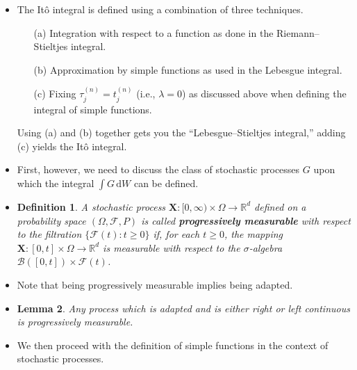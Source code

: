 \documentclass[10pt]{article}
\newtheorem{lemma}{Lemma}
\newtheorem{definition}[lemma]{Definition}
\newcommand{\dee}{\mathrm{d}}
\newcommand{\ve}[1]{\mathbf{#1}}
\newcommand{\mcal}[1]{\mathcal{#1}}
\newcommand{\Real}{\mathbb{R}}
\begin{document}
\begin{itemize}
  \item The It\^{o} integral is defined using a combination of three techniques.
  \begin{itemize}
    \item[(a)] Integration with respect to a function as done in the Riemann--Stieltjes integral.
    \item[(b)] Approximation by simple functions as used in the Lebesgue integral.
    \item[(c)] Fixing $\tau_{j}^{(n)} = t_{j}^{(n)}$ (i.e., $\lambda = 0$) as discussed above when defining the integral of simple functions.
  \end{itemize}
  Using (a) and (b) together gets you the ``Lebesgue--Stieltjes integral,'' adding (c) yields the It\^{o} integral.

  \item First, however, we need to discuss the class of stochastic processes $G$ upon which the integral $\int G\, \dee W$ can be defined.

  \item \begin{definition}
    A stochastic process $\ve{X}: [0, \infty) \times \Omega \rightarrow \Real^d$ defined on a probability space $(\Omega, \mcal{F}, P)$ is called {\bf progressively measurable} with respect to the filtration $\{ \mcal{F}(t) : t \geq 0 \}$ if, for each $t \geq 0$, the mapping $\ve{X}: [0,t] \times \Omega \rightarrow \Real^d$ is measurable with respect to the $\sigma$-algebra $\mcal{B}([0,t]) \times \mcal{F}(t)$.
  \end{definition}

  \item Note that being progressively measurable implies being adapted.

  \item \begin{lemma}
    Any process which is adapted and is either right or left continuous is progressively measurable.
  \end{lemma}

  \item We then proceed with the definition of simple functions in the context of stochastic processes.
  

\end{itemize}
\end{document}
